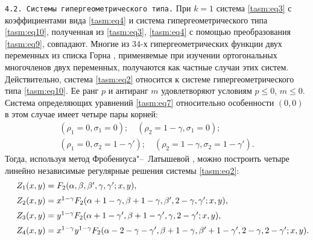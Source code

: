 \texttt{4.2. Системы гипергеометрического типа.} 
При $k=1$ система \eqref{tasm:eq3} с коэффициентами вида \eqref{tasm:eq4} и система гипергеометрического типа \eqref{tasm:eq10}, полученная из \eqref{tasm:eq3}, \eqref{tasm:eq4} с помощью преобразования \eqref{tasm:eq9}, совпадают. 
Многие из 34-х гипергеометрических функции двух переменных из списка Горна \cite{tasm:6}, применяемые при изучении
ортогональных многочленов двух переменных, получаются как частные случаи этих систем. 
Действительно, система \eqref{tasm:eq2} относится к системе гипергеометрического типа \eqref{tasm:eq10}. 
Ее ранг $p$ и антиранг $m$ удовлетворяют условиям $p\leq 0$, $m\leq 0$. 
Система определяющих уравнений  \eqref{tasm:eq7} относительно особенности $(0, 0)$ в этом случае имеет
четыре пары корней: 
\begin{gather}
(\rho_{1}=0, \sigma_{1}=0);\quad (\rho_{2}=1-\gamma, \sigma_{1}=0); \\
(\rho_{1}=0,\sigma_{2}=1-\gamma'); \quad (\rho_{2}=1-\gamma,\sigma_{2}=1-\gamma').
\end{gather}
Тогда, используя метод Фробениуса"--~Латышевой \cite{tasm:3}, можно построить четыре линейно независимые регулярные решения системы \eqref{tasm:eq2}:
\begin{equation}
\begin{array}{l}
Z_{1}(x,y)=F_{2}(\alpha, \beta, \beta', \gamma, \gamma'; x, y),\\[0.2cm]
Z_{2}(x,y)=x^{1-\gamma}    F_{2}(\alpha+1-\gamma, \beta+1-\gamma, \beta', 2-\gamma, \gamma'; x, y),\\[0.2cm]
Z_{3}(x,y)=y^{1-\gamma}    F_{2}(\alpha+1-\gamma', \beta+1-\gamma', \gamma, 2-\gamma'; x, y),\\[0.2cm]
Z_{4}(x,y)=x^{1-\gamma}    y^{1-\gamma}   
F_{2}(\alpha-2-\gamma-\gamma', \beta+1-\gamma, \beta'+1-\gamma',
2-\gamma, 2-\gamma'; x, y). \hspace{-5mm}
\end{array}
\label{tasm:eq13}
\end{equation}

\smallskip

